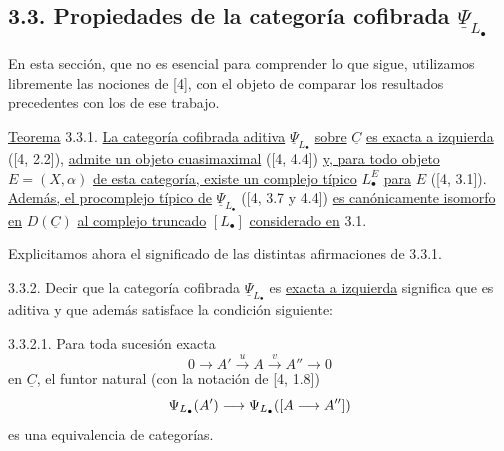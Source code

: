 \subsection*{3.3. Propiedades de la categoría cofibrada
$\underline\Psi_{L_\bullet}$}

En esta sección, que no es esencial para comprender lo que sigue,
utilizamos libremente las nociones de [4], con el objeto de comparar
los resultados precedentes con los de ese trabajo.

\underline{Teorema} 3.3.1. \underline{La categoría cofibrada aditiva}
$\underline\Psi_{L_\bullet}$ \underline{sobre} $\underline C$
\underline{es exacta a izquierda} ([4, 2.2]), \underline{admite un
objeto cuasimaximal} ([4, 4.4]) \underline{y, para todo objeto}
$E=(X,\alpha)$ \underline{de esta categoría, existe un complejo
típico} $L^E_\bullet$ \underline{para} $E$ ([4, 3.1]).
\underline{Además, el procomplejo típico de}
$\underline\Psi_{L_\bullet}$ ([4, 3.7 y 4.4])
\underline{es canónicamente isomorfo en} $D(\underline C)$
\underline{al complejo truncado} $[L_\bullet]$
\underline{considerado en} 3.1.

Explicitamos ahora el significado de las distintas afirmaciones de
3.3.1.

3.3.2. Decir que la categoría cofibrada
$\underline\Psi_{L_\bullet}$ es \underline{exacta a izquierda}
significa que es aditiva y que además satisface la condición siguiente:

3.3.2.1. Para toda sucesión exacta
\[
 0\longrightarrow A'\xrightarrow{u}A\xrightarrow{v}A''
 \longrightarrow0
\]
en $\underline C$, el funtor natural (con la notación de [4, 1.8])
\[
 \underline\Psi_{L_\bullet}(\sisi{A}{A'})
 \longrightarrow
 \underline\Psi_{L_\bullet}([A\longrightarrow A''])
\]
es una equivalencia de categorías.

